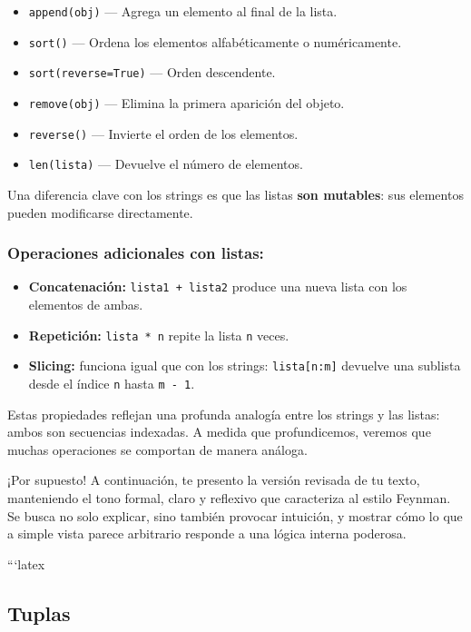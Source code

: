 \documentclass{article}
\theoremstyle{nonumberplain}
\begin{document}
\begin{itemize}
    \item \texttt{append(obj)} — Agrega un elemento al final de la lista.
    \item \texttt{sort()} — Ordena los elementos alfabéticamente o numéricamente.
    \item \texttt{sort(reverse=True)} — Orden descendente.
    \item \texttt{remove(obj)} — Elimina la primera aparición del objeto.
    \item \texttt{reverse()} — Invierte el orden de los elementos.
    \item \texttt{len(lista)} — Devuelve el número de elementos.
\end{itemize}

Una diferencia clave con los strings es que las listas \textbf{son mutables}: sus elementos pueden modificarse directamente.



\subsubsection*{Operaciones adicionales con listas:}

\begin{itemize}
    \item \textbf{Concatenación:} \texttt{lista1 + lista2} produce una nueva lista con los elementos de ambas.
    \item \textbf{Repetición:} \texttt{lista * n} repite la lista \texttt{n} veces.
    \item \textbf{Slicing:} funciona igual que con los strings: \texttt{lista[n:m]} devuelve una sublista desde el índice \texttt{n} hasta \texttt{m - 1}.
\end{itemize}

Estas propiedades reflejan una profunda analogía entre los strings y las listas: ambos son secuencias indexadas. A medida que profundicemos, veremos que muchas operaciones se comportan de manera análoga.


¡Por supuesto! A continuación, te presento la versión revisada de tu texto, manteniendo el tono formal, claro y reflexivo que caracteriza al estilo Feynman. Se busca no solo explicar, sino también provocar intuición, y mostrar cómo lo que a simple vista parece arbitrario responde a una lógica interna poderosa.



```latex
\subsection*{Tuplas}
\end{document}
